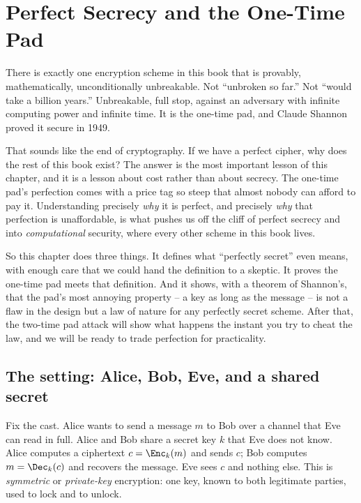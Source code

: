 \chapter{Perfect Secrecy and the One-Time Pad}

There is exactly one encryption scheme in this book that is provably, mathematically, unconditionally unbreakable. Not ``unbroken so far.'' Not ``would take a billion years.'' Unbreakable, full stop, against an adversary with infinite computing power and infinite time. It is the one-time pad, and Claude Shannon proved it secure in 1949.

That sounds like the end of cryptography. If we have a perfect cipher, why does the rest of this book exist? The answer is the most important lesson of this chapter, and it is a lesson about cost rather than about secrecy. The one-time pad's perfection comes with a price tag so steep that almost nobody can afford to pay it. Understanding precisely \emph{why} it is perfect, and precisely \emph{why} that perfection is unaffordable, is what pushes us off the cliff of perfect secrecy and into \emph{computational} security, where every other scheme in this book lives.

So this chapter does three things. It defines what ``perfectly secret'' even means, with enough care that we could hand the definition to a skeptic. It proves the one-time pad meets that definition. And it shows, with a theorem of Shannon's, that the pad's most annoying property -- a key as long as the message -- is not a flaw in the design but a law of nature for any perfectly secret scheme. After that, the two-time pad attack will show what happens the instant you try to cheat the law, and we will be ready to trade perfection for practicality.

\section{The setting: Alice, Bob, Eve, and a shared secret}
\label{ch09:setting}

Fix the cast. Alice wants to send a message $m$ to Bob over a channel that Eve can read in full. Alice and Bob share a secret key $k$ that Eve does not know. Alice computes a ciphertext $c = \Enc_k(m)$ and sends $c$; Bob computes $m = \Dec_k(c)$ and recovers the message. Eve sees $c$ and nothing else. This is \emph{symmetric} or \emph{private-key} encryption: one key, known to both legitimate parties, used to lock and to unlock.

